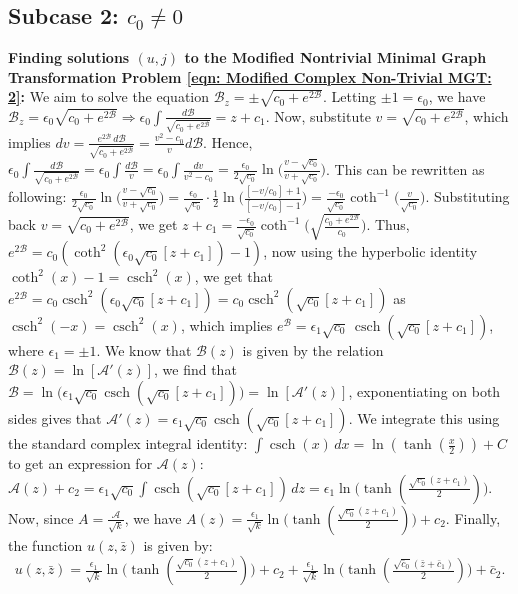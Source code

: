 \documentclass[12pt]{article}
\theoremstyle{plain}
\theoremstyle{definition}
\theoremstyle{remark}
\begin{document}
 \subsection{Subcase 2: $c_0\neq0$}\label{section: c_0 neq 0 k-positive}
  \textbf{Finding solutions \((u,j)\) to the Modified Nontrivial Minimal Graph Transformation Problem \ref{eqn: Modified Complex Non-Trivial MGT: 2}:} We aim to solve the equation \(\mathcal{B}_z = \pm \sqrt{c_0 + e^{2\mathcal{B}}}\). Letting \(\pm 1 = \epsilon_0\), we have \(\mathcal{B}_z = \epsilon_0 \sqrt{c_0 + e^{2\mathcal{B}}} \Rightarrow \epsilon_0 \int \frac{d\mathcal{B}}{\sqrt{c_0 + e^{2\mathcal{B}}}} = z + c_1.\) Now, substitute \(v = \sqrt{c_0 + e^{2\mathcal{B}}}\), which implies \(dv = \frac{e^{2\mathcal{B}}\, d\mathcal{B}}{\sqrt{c_0 + e^{2\mathcal{B}}}} = \frac{v^2 - c_0}{v} d\mathcal{B}\). Hence, \(\epsilon_0 \int \frac{d\mathcal{B}}{\sqrt{c_0 + e^{2\mathcal{B}}}} =\epsilon_0\int\frac{d\mathcal{B}}{v}=\epsilon_0\int\frac{dv}{v^2-c_0}= \frac{\epsilon_0}{2\sqrt{c_0}} \ln\big(\frac{v - \sqrt{c_0}}{v + \sqrt{c_0}}\big)\). This can be rewritten as following: \(\frac{\epsilon_0}{2\sqrt{c_0}}\ln\big(\frac{v-\sqrt{c_0}}{v+\sqrt{c_0}}\big)=\frac{\epsilon_0}{\sqrt{c_0}}\cdot\frac{1}{2} \ln\big(\frac{[-v/c_0] + 1}{[-v/c_0] - 1}\big) =\frac{-\epsilon_0}{\sqrt{c_0}} \coth^{-1}\big(\frac{v}{\sqrt{c_0}}\big)\). Substituting back \(v = \sqrt{c_0 + e^{2\mathcal{B}}}\), we get \(z + c_1 = \frac{-\epsilon_0}{\sqrt{c_0}} \coth^{-1}\big(\sqrt{\frac{c_0 + e^{2\mathcal{B}}}{c_0}}\big)\). Thus, \(e^{2\mathcal{B}} = c_0 (\coth^2(\epsilon_0 \sqrt{c_0}[z + c_1]) - 1)\), now using the hyperbolic identity \(\coth^2(x)-1=\operatorname{csch}^2(x)\), we get that \(e^{2\mathcal{B}}=c_0\operatorname{csch}^2(\epsilon_0 \sqrt{c_0}[z + c_1])=c_0\operatorname{csch}^2(\sqrt{c_0}[z + c_1])\) as \(\operatorname{csch}^2(-x)=\operatorname{csch}^2(x)\), which implies \(e^{\mathcal{B}} = \epsilon_1 \sqrt{c_0}\, \operatorname{csch}(\sqrt{c_0}[z + c_1])\), where \(\epsilon_1 = \pm 1.\) We know that \(\mathcal{B}(z)\) is given by the relation \(\mathcal{B}(z) = \ln[\mathcal{A}'(z)]\), we find that \(\mathcal{B} = \ln\big(\epsilon_1 \sqrt{c_0}\operatorname{csch}(\sqrt{c_0}[z + c_1])\big) = \ln[\mathcal{A}'(z)]\), exponentiating on both sides gives that \(\mathcal{A}'(z) = \epsilon_1 \sqrt{c_0}\operatorname{csch}(\sqrt{c_0}[z + c_1])\). We integrate this using the standard complex integral identity: \(\int \operatorname{csch}(x)\, dx = \ln(\tanh(\tfrac{x}{2})) + C\) to get an expression for \(\mathcal{A}(z)\): \(\mathcal{A}(z) + c_2 = \epsilon_1 \sqrt{c_0} \int \operatorname{csch}(\sqrt{c_0}[z + c_1])\, dz = \epsilon_1\ln\big(\tanh(\tfrac{\sqrt{c_0}(z + c_1)}{2})\big)\). Now, since \(A = \tfrac{\mathcal{A}}{\sqrt{k}}\), we have \(A(z) = \tfrac{\epsilon_1}{\sqrt{k}}\ln\big(\tanh(\tfrac{\sqrt{c_0}(z + c_1)}{2})\big) + c_2\). Finally, the function \(u(z, \bar{z})\) is given by:
  $$u(z, \bar{z}) = \tfrac{\epsilon_1}{\sqrt{k}} \ln\big(\tanh(\tfrac{\sqrt{c_0}(z + c_1)}{2})\big) + c_2 + \tfrac{\epsilon_1}{\sqrt{k}} \ln\big(\tanh(\tfrac{\sqrt{\bar{c}_0}(\bar{z} + \bar{c}_1)}{2})\big) + \bar{c}_2.$$
 
\end{document}
